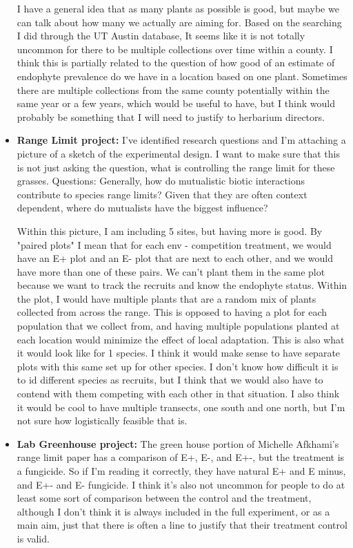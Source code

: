 \documentclass{article}
\begin{document}
\begin{itemize}
{I have a general idea that as many plants as possible is good, but maybe we can talk about how many we actually are aiming for. Based on the searching I did through the UT Austin database, It seems like it is not totally uncommon for there to be multiple collections over time within a county. I think this is partially related to the question of how good of an estimate of endophyte prevalence do we have in a location based on one plant. Sometimes there are multiple collections from the same county potentially within the same year or a few years, which would be useful to have, but I think would probably be something that I will need to justify to herbarium directors.}

\item{\textbf{Range Limit project:}
I've identified research questions and I'm attaching a picture of a sketch of the experimental design. I want to make sure that this is not just asking the question, what is controlling the range limit for these grasses.
      Questions: 
                Generally, how do mutualistic biotic interactions contribute to species range limits?
                Given that they are often context dependent, where do mutualists have the biggest influence?

 Within this picture, I am including 5 sites, but having more is good. By "paired plots" I mean that for each env - competition treatment, we would have an E+ plot and an E- plot that are next to each other, and we would have more than one of these pairs. We can't plant them in the same plot because we want to track the recruits and know the endophyte status. Within the plot, I would have multiple plants that are a random mix of plants collected from across the range. This is opposed to having a plot for each population that we collect from, and having multiple populations planted at each location would minimize the effect of local adaptation. This is also what it would look like for 1 species. I think it would make sense to have separate plots with this same set up for other species. I don't know how difficult it is to id different species as recruits, but I think that we would also have to contend with them competing with each other in that situation.  I also think it would be cool to have multiple transects, one south and one north, but I'm not sure how logistically feasible that is.}

\item{\textbf{Lab Greenhouse project:}
The green house portion of Michelle Afkhami's range limit paper has a comparison of E+, E-, and E+-, but the treatment is a fungicide. So if I'm reading it correctly, they have natural E+ and E minus, and E+- and E- fungicide. I think it's also not uncommon for people to do at least some sort of comparison between the control and the treatment, although I don't think it is always included in the full experiment, or as a main aim, just that there is often a line to justify that their treatment control is valid.}
\end{itemize}
\end{document}
